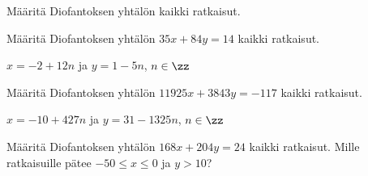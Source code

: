 \begin{kotitehtavasivu}
\begin{tehtava}
    \begin{alakohdat}
    \end{alakohdat}
    
    \begin{vastaus}
        \begin{alakohdat}
        \end{alakohdat}
    \end{vastaus}
    
\end{tehtava}

\begin{tehtava}
    Määritä Diofantoksen yhtälön kaikki ratkaisut.
    \begin{alakohdat}
    \end{alakohdat}

    \begin{vastaus}
        \begin{alakohdat}
        \end{alakohdat}
    \end{vastaus}
    
\end{tehtava}

\begin{tehtava}
    Määritä Diofantoksen yhtälön $35x + 84y = 14$ kaikki ratkaisut.
    
    \begin{vastaus}
        $x = -2 + 12n$ ja $y = 1 - 5n$, $n\in\zz$
    \end{vastaus}
    
\end{tehtava}

\begin{tehtava}
    Määritä Diofantoksen yhtälön $11925x + 3843y = -117$ kaikki ratkaisut.
    
    \begin{vastaus}
        $x = -10 + 427n$ ja $y = 31 - 1325n$, $n\in\zz$
    \end{vastaus}
    
\end{tehtava}

\begin{tehtava}
    Määritä Diofantoksen yhtälön $168x + 204y = 24$ kaikki ratkaisut. Mille ratkaisuille pätee $-50 \le x \le 0$ ja $y > 10$?
    

\end{tehtava}
\end{kotitehtavasivu}
